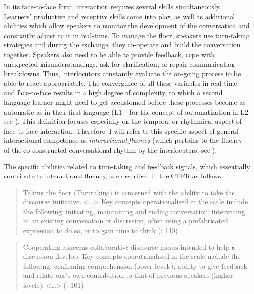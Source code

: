 In its face-to-face form, interaction requires several skills simultaneously. Learners’ productive and receptive skills come into play, as well as additional abilities which allow speakers to monitor the development of the conversation and constantly adjust to it in real-time. To manage the floor, speakers use turn-taking strategies and during the exchange, they co-operate and build the conversation together. Speakers also need to be able to provide feedback, cope with unexpected misunderstandings, ask for clarification, or repair communication breakdowns. Thus, interlocutors constantly evaluate the on-going process to be able to react appropriately. The convergence of all these variables in real time and face-to-face results in a high degree of complexity, to which a second language learner might need to get accustomed before these processes become as automatic as in their first language (L1 – for the concept of automatization in L2 see \citealt{Kormos2006}). This definition focuses especially on the temporal or rhythmical aspect of face-to-face interaction. Therefore, I will refer to this specific aspect of general interactional competence as \textit{interactional fluency} (which pertains to the fluency of the co-constructed conversational rhythm by the interlocutors, see \citealt{Peltonen2024,Peltonen2020}).

The specific abilities related to turn-taking and feedback signals, which essentially contribute to interactional fluency, are described in the CEFR as follows:

\begin{quote}
Taking the floor (Turntaking) is concerned with the ability to take the discourse initiative. <…> Key concepts operationalised in the scale include the following: initiating, maintaining and ending conversation; intervening in an existing conversation or discussion, often using a prefabricated expression to do so, or to gain time to think (\citealt{GoodierNorth2018}: 140) 
\end{quote}

\begin{quote}
Cooperating concerns collaborative discourse moves intended to help a discussion develop. Key concepts operationalised in the scale include the following: confirming comprehension (lower levels); ability to give feedback and relate one’s own contribution to that of previous speakers (higher levels); <…> (\citealt{GoodierNorth2018}: 101)
\end{quote}

